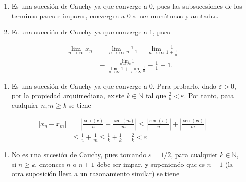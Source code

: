 \documentclass[
  spanish,
  a4paper,
]{scrreport}
\providecommand{\tightlist}{%
  \setlength{\itemsep}{0pt}\setlength{\parskip}{0pt}}
\theoremstyle{definition}
\theoremstyle{remark}
\begin{document}
\begin{tcolorbox}[enhanced jigsaw, arc=.35mm, bottomrule=.15mm, bottomtitle=1mm, breakable, colback=white, colbacktitle=quarto-callout-tip-color!10!white, colframe=quarto-callout-tip-color-frame, coltitle=black, left=2mm, leftrule=.75mm, opacityback=0, opacitybacktitle=0.6, rightrule=.15mm, title=\textcolor{quarto-callout-tip-color}{\faLightbulb}\hspace{0.5em}{Solución}, titlerule=0mm, toprule=.15mm, toptitle=1mm]

\begin{enumerate}
\def\labelenumi{\alph{enumi}.}
\item
  Es una sucesión de Cauchy ya que converge a 0, pues las subsucesiones
  de los términos pares e impares, convergen a 0 al ser monótonas y
  acotadas.
\item
  Es una sucesión de Cauchy ya que converge a 1, pues
\end{enumerate}

\begin{align*}
\lim_{n\to\infty} x_n &= \lim_{n\to\infty}\frac{n}{n+1} = \lim_{n\to\infty} \frac{1}{1+\frac{1}{n}}\\  
&= \frac{\lim_{n\to\infty} 1}{\lim_{n\to\infty} 1 + \lim_{n\to\infty}\frac{1}{n}} = \frac{1}{1} = 1.
\end{align*}

\begin{enumerate}
\def\labelenumi{\alph{enumi}.}
\setcounter{enumi}{2}
\tightlist
\item
  Es una sucesión de Cauchy ya que converge a 0. Para probarlo, dado
  \(\varepsilon>0\), por la propiedad arquimediana, existe
  \(k\in\mathbb{N}\) tal que \(\frac{2}{k}<\varepsilon\). Por tanto,
  para cualquier \(n,m\geq k\) se tiene
\end{enumerate}

\begin{align*}
|x_n-x_m| &= \left|\frac{\operatorname{sen}(n)}{n}-\frac{\operatorname{sen}(m)}{m}\right| \leq \left|\frac{\operatorname{sen}(n)}{n}\right|+\left|\frac{\operatorname{sen}(m)}{m}\right|\\  
& \leq \frac{1}{n}+\frac{1}{m}\leq \frac{1}{k}+\frac{1}{k} = \frac{2}{k} < \varepsilon.
\end{align*}

\begin{enumerate}
\def\labelenumi{\alph{enumi}.}
\setcounter{enumi}{3}
\tightlist
\item
  No es una sucesión de Cauchy, pues tomando \(\varepsilon=1/2\), para
  cualquier \(k\in\mathbb{N}\), si \(n\geq k\), entonces \(n\) o \(n+1\)
  debe ser impar, y suponiendo que es \(n+1\) (la otra suposición lleva
  a un razonamiento similar) se tiene
\end{enumerate}


\end{tcolorbox}
\end{document}
